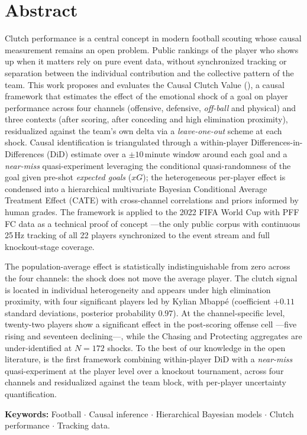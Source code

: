 \chapter*{Abstract}

Clutch performance is a central concept in modern football scouting whose
causal measurement remains an open problem. Public
rankings of the player who shows up when it matters rely on pure event
data, without synchronized tracking or separation between the individual
contribution and the collective pattern of the team. This work proposes
and evaluates the Causal Clutch Value (\CCV), a causal framework that
estimates the effect of the emotional shock of a goal on player
performance across four channels (offensive, defensive, \textit{off-ball}
and physical) and three contexts (after scoring, after conceding and high
elimination proximity), residualized against the team's own delta via a
\textit{leave-one-out} scheme at each shock. Causal identification is
triangulated through a within-player Differences-in-Differences (DiD)
estimate over a $\pm 10$\,minute window around each goal and a
\textit{near-miss} quasi-experiment leveraging the conditional
quasi-randomness of the goal given pre-shot \textit{expected goals}
($xG$); the heterogeneous per-player effect is condensed into a
hierarchical multivariate Bayesian Conditional Average Treatment Effect
(CATE) with cross-channel correlations and priors informed by human
grades. The framework is applied to the 2022 FIFA World
Cup with PFF FC data as a technical proof of concept ---the only public
corpus with continuous 25\,Hz tracking of all 22 players synchronized
to the event stream and full knockout-stage coverage.

The population-average effect is statistically indistinguishable from
zero across the four channels: the shock does not move the average
player. The clutch signal is located in individual heterogeneity and
appears under high elimination proximity, with four significant players
led by Kylian Mbappé (coefficient $+0.11$ standard deviations, posterior
probability $0.97$). At the channel-specific level, twenty-two players
show a significant effect in the post-scoring offense cell ---five rising
and seventeen declining---, while the Chasing and Protecting aggregates
are under-identified at $N=172$ shocks. To the best of our knowledge
in the open literature, \CCV is the first framework combining
within-player DiD with a \textit{near-miss} quasi-experiment at the
player level over a knockout tournament, across four channels and
residualized against the team block, with per-player uncertainty
quantification.

\vspace{1em}
\noindent\textbf{Keywords:} Football $\cdot$ Causal inference $\cdot$
Hierarchical Bayesian models $\cdot$ Clutch performance $\cdot$ Tracking
data.

\clearpage
